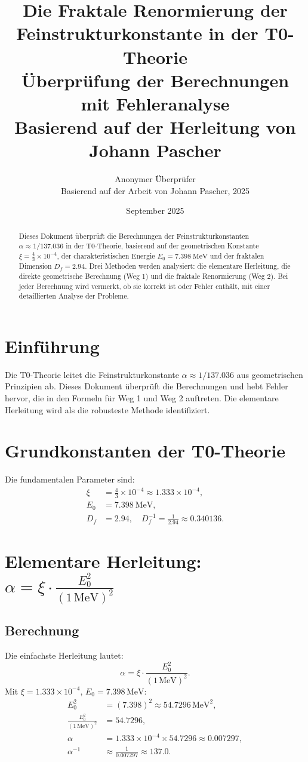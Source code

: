 \documentclass[12pt,a4paper]{article}
\title{\textbf{Die Fraktale Renormierung der Feinstrukturkonstante in der T0-Theorie}\\[0.5cm]
	\large Überprüfung der Berechnungen mit Fehleranalyse\\[0.3cm]
	\normalsize Basierend auf der Herleitung von Johann Pascher}
\author{Anonymer Überprüfer\\
	\small Basierend auf der Arbeit von Johann Pascher, 2025}
\date{September 2025}
\theoremstyle{definition}
\begin{document}
	
	\maketitle
	
	\begin{abstract}
		Dieses Dokument überprüft die Berechnungen der Feinstrukturkonstanten \(\alpha \approx 1/137.036\) in der T0-Theorie, basierend auf der geometrischen Konstante \(\xi = \frac{4}{3} \times 10^{-4}\), der charakteristischen Energie \(E_0 = \SI{7.398}{\MeV}\) und der fraktalen Dimension \(D_f = 2.94\). Drei Methoden werden analysiert: die elementare Herleitung, die direkte geometrische Berechnung (Weg 1) und die fraktale Renormierung (Weg 2). Bei jeder Berechnung wird vermerkt, ob sie korrekt ist oder Fehler enthält, mit einer detaillierten Analyse der Probleme.
	\end{abstract}
	
	\tableofcontents
	\newpage
	
	\section{Einführung}
	Die T0-Theorie leitet die Feinstrukturkonstante \(\alpha \approx 1/137.036\) aus geometrischen Prinzipien ab. Dieses Dokument überprüft die Berechnungen und hebt Fehler hervor, die in den Formeln für Weg 1 und Weg 2 auftreten. Die elementare Herleitung wird als die robusteste Methode identifiziert.
	
	\section{Grundkonstanten der T0-Theorie}
	Die fundamentalen Parameter sind:
	\begin{align}
		\xi &= \frac{4}{3} \times 10^{-4} \approx 1.333 \times 10^{-4}, \\
		E_0 &= \SI{7.398}{\MeV}, \\
		D_f &= 2.94, \quad D_f^{-1} = \frac{1}{2.94} \approx 0.340136.
	\end{align}
	
	\section{Elementare Herleitung: \(\alpha = \xi \cdot \frac{E_0^2}{(1 \, \text{MeV})^2}\)}
	\subsection{Berechnung}
	Die einfachste Herleitung lautet:
	\begin{equation}
		\alpha = \xi \cdot \frac{E_0^2}{(1 \, \text{MeV})^2}.
	\end{equation}
	Mit \(\xi = 1.333 \times 10^{-4}\), \(E_0 = 7.398 \, \text{MeV}\):
	\begin{align}
		E_0^2 &= (7.398)^2 \approx 54.7296 \, \text{MeV}^2, \\
		\frac{E_0^2}{(1 \, \text{MeV})^2} &= 54.7296, \\
		\alpha &= 1.333 \times 10^{-4} \times 54.7296 \approx 0.007297, \\
		\alpha^{-1} &\approx \frac{1}{0.007297} \approx 137.0.
	\end{align}
	
\end{document}
